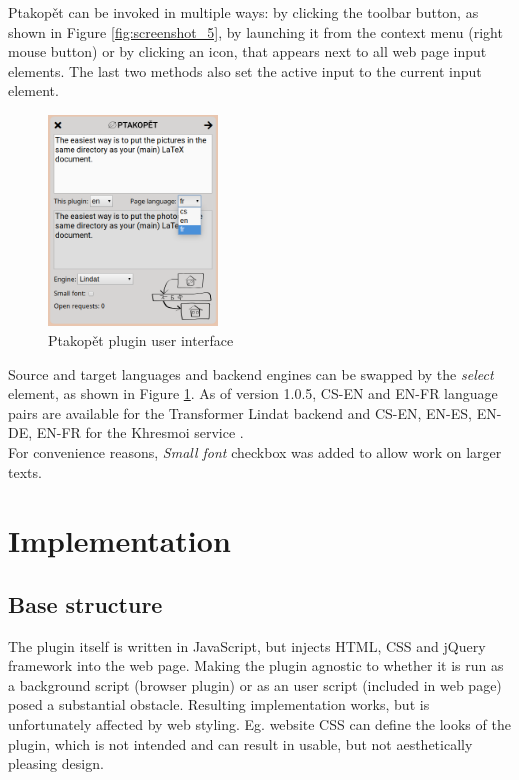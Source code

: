 \documentclass[a4paper]{article}
\begin{document}
Ptakopět can be invoked in multiple ways: by clicking the toolbar button, as shown in Figure \ref{fig:screenshot_5}, by launching it from the context menu (right mouse button) or by clicking an icon, that appears next to all web page input elements. The last two methods also set the active input to the current input element.

\pagebreak

\begin{figure}[h]
\centering
\includegraphics[width=0.4\textwidth]{screenshot_4}
\caption{Ptakopět plugin user interface}
\label{fig:screenshot_4}
\end{figure}
\vspace{0.3cm}

Source and target languages and backend engines can be swapped by the \textit{select} element, as shown in Figure \ref{fig:screenshot_4}. As of version 1.0.5, CS-EN and EN-FR language pairs are available for the Transformer Lindat backend \cite{transformer} and CS-EN, EN-ES, EN-DE, EN-FR for the Khresmoi service \cite{khresmoi}.\\
For convenience reasons, \textit{Small font} checkbox was added to allow work on larger texts.


\section{Implementation}
\subsection{Base structure}
The plugin itself is written in JavaScript, but injects HTML, CSS and jQuery framework into the web page. Making the plugin agnostic to whether it is run as a background script (browser plugin) or as an user script (included in web page) posed a substantial obstacle. Resulting implementation works, but is unfortunately affected by web styling. Eg.  website CSS can define the looks of the plugin, which is not intended and can result in usable, but not aesthetically pleasing design.
\end{document}
